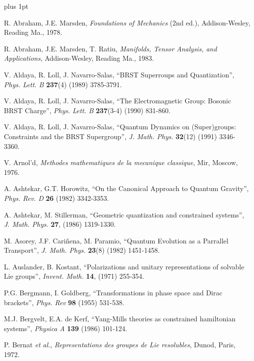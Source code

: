 \documentclass[12pt]{article}
\begin{document}
\begin{thebibliography}{55}

\itemsep 1pt plus 1pt


{\sc R. Abraham, J.E. Marsden},
{\it Foundations of Mechanics\/} (2nd ed.),
     Addison-Wesley, Reading Ma., 1978.

{\sc R. Abraham, J.E. Marsden, T. Ratiu},
{\it Manifolds, Tensor Analysis, and Applications},
Addison-Wesley, Reading Ma., 1983.

{\sc V. Aldaya, R. Loll, J. Navarro-Salas},
``BRST Superroups and Quantization'',
{\it Phys. Lett. B} {\bf 237}(4) (1989) 3785-3791.

{\sc V. Aldaya, R. Loll, J. Navarro-Salas},
``The Electromagnetic Group: Bosonic BRST Charge'',
{\it Phys. Lett. B} {\bf 237}(3-4) (1990) 831-860.

{\sc V. Aldaya, R. Loll, J. Navarro-Salas},
``Quantum Dynamics on (Super)groups: Constraints and the BRST
Supergroup'',
{\it J. Math. Phys.} {\bf 32}(12) (1991) 3346-3360.

{\sc V. Arnol'd},
{\it Methodes mathematiques de la mecanique classique\/},
Mir, Moscow, 1976.

{\sc A. Ashtekar, G.T. Horowitz},
``On the Canonical Approach to Quantum Gravity'',
{\it Phys. Rev. D} {\bf 26} (1982) 3342-3353.

{\sc A. Ashtekar, M. Stillerman},
``Geometric quantization and constrained systems'',
{\it J. Math. Phys.} {\bf 27}, (1986) 1319-1330.

{\sc M. Asorey, J.F. Cari\~nena, M. Paramio},
``Quantum Evolution as a Parrallel Transport'',
{\it J. Math. Phys.} {\bf 23}(8) (1982) 1451-1458.

{\sc L. Auslander, B. Kostant},
``Polarizations and unitary representations of solvable Lie groups'',
{\it Invent. Math.}
{\bf 14}, (1971) 255-354.

{\sc P.G. Bergmann, I. Goldberg},
``Transformations in phase space and Dirac brackets'',
{\it Phys. Rev} {\bf 98} (1955) 531-538.

{\sc M.J. Bergvelt, E.A. de Kerf},
``Yang-Mills theories as constrained hamiltonian systems'',
{\it Physica A} {\bf 139} (1986) 101-124.

{\sc P. Bernat} {\it et al.},
{\it Representations des groupes de Lie resolubles},
Dunod, Paris, 1972.


\end{thebibliography}
\end{document}
